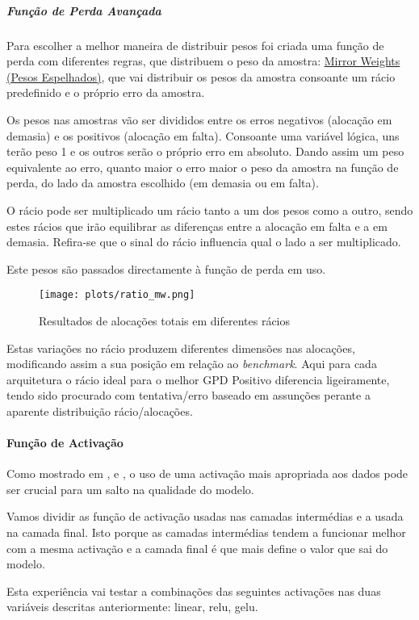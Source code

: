 

\subparagraph{Função de Perda Avançada}\label{se:advancedloss}
\text{ }  \par
Para escolher a melhor maneira de distribuir pesos foi criada uma função de perda com diferentes regras, que distribuem o peso da amostra:
\href{https://github.com/alquimodelia/alquitable/blob/main/alquitable/advanced_losses.py#L33}{Mirror Weights (Pesos Espelhados)},
que vai distribuir os pesos da amostra consoante um rácio predefinido e o próprio erro da amostra.\par
Os pesos nas amostras vão ser divididos entre os erros negativos (alocação em demasia) e os positivos (alocação em falta). Consoante uma variável lógica,  uns terão peso 1 e os outros serão o próprio erro em absoluto. Dando assim um peso equivalente ao erro, quanto maior o erro maior o peso da amostra na função de perda, do lado da amostra escolhido (em demasia ou em falta).\par
O rácio pode ser multiplicado um rácio tanto a um dos pesos como a outro, sendo estes rácios que irão equilibrar as diferenças entre a alocação em falta e a em demasia. Refira-se que o sinal do rácio influencia qual o lado a ser multiplicado.\par
Este pesos são passados directamente à função de perda em uso.\par


\begin{figure}[H]
    \centering
    \texttt{[image: plots/ratio\_mw.png]}
    \caption{Resultados de alocações totais em diferentes rácios}
    \label{fig:resexpratiomw}
  \end{figure}

Estas variações no rácio produzem diferentes dimensões nas alocações, modificando assim a sua posição em relação ao \textit{benchmark}. Aqui para cada arquitetura o rácio ideal para o melhor GPD Positivo diferencia ligeiramente, tendo sido procurado com tentativa/erro baseado em assunções perante a aparente distribuição rácio/alocações.\par


\paragraph{Função de Activação}
\text{ }  \par

Como mostrado em \cite{Vaswani2017}, e \cite{Liu2022}, o uso de uma activação mais apropriada aos dados pode ser crucial para um salto na qualidade do modelo.\par
Vamos dividir as função de activação usadas nas camadas intermédias e a usada na camada final. Isto porque as camadas intermédias tendem a funcionar melhor com a mesma activação e a camada final é que mais define o valor que sai do modelo.\par
Esta experiência vai testar a combinações das seguintes activações nas duas variáveis descritas anteriormente: linear, relu, gelu.\par


